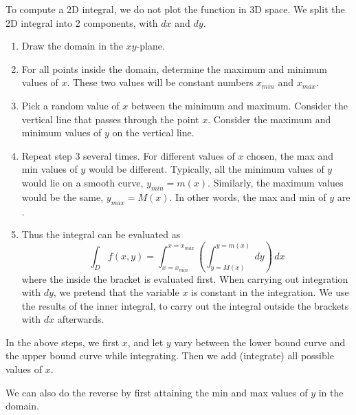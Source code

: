 \documentclass[11pt,fleqn]{book} %
\begin{document}
To compute a 2D integral, we do not plot the function in 3D space. We split the 2D integral into 2 components, with $dx$ and $dy$.

\begin{enumerate}
    \item Draw the domain in the $xy$-plane.

    \item For all points inside the domain, determine the maximum and minimum values of $x$. These two values will be constant numbers $x_{min}$ and $x_{max}$.

    \item Pick a random value of $x$ between the minimum and maximum. Consider the vertical line that passes through the point $x$. Consider the maximum and minimum values of $y$ on the vertical line.

    \item Repeat step 3 several times. For different values of $x$ chosen, the max and min values of $y$ would be different. Typically, all the minimum values of $y$ would lie on a smooth curve, $y_{min} = m(x)$. Similarly, the maximum values would be the same, $y_{max} = M(x)$. In other words, the max and min of $y$ are .

    \item Thus the integral can be evaluated as $$\int_D f(x, y) = \int_{x=x_{min}}^{x=x_{max}} \left( \int_{y=M(x)}^{y=m(x)} \,dy \right) \,dx$$ where the  inside the bracket is evaluated first. When carrying out integration with $dy$, we pretend that the variable $x$ is constant in the integration. We use the results of the inner integral, to carry out the integral outside the brackets with $dx$ afterwards.
\end{enumerate}

In the above steps, we first  $x$, and let $y$ vary between the lower bound curve and the upper bound curve while integrating. Then we add (integrate) all possible values of $x$.

We can also do the reverse by first attaining the min and max values of $y$ in the domain.
\end{document}
